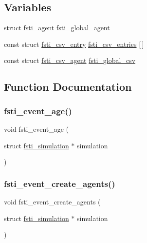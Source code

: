 \subsection*{Variables}
\begin{DoxyCompactItemize}
\item 
struct \mbox{\hyperlink{structfsti__agent}{fsti\+\_\+agent}} \mbox{\hyperlink{fsti-events_8c_a0c5214ba8681a0691658466b19dde4d5}{fsti\+\_\+global\+\_\+agent}}
\item 
const struct \mbox{\hyperlink{structfsti__csv__entry}{fsti\+\_\+csv\+\_\+entry}} \mbox{\hyperlink{fsti-events_8c_a7101c8980d633b64a8060f6f91c48dcd}{fsti\+\_\+csv\+\_\+entries}} \mbox{[}$\,$\mbox{]}
\item 
const struct \mbox{\hyperlink{structfsti__csv__agent}{fsti\+\_\+csv\+\_\+agent}} \mbox{\hyperlink{fsti-events_8c_a7f2bcfae00114763a58e88a609eacf3e}{fsti\+\_\+global\+\_\+csv}}
\end{DoxyCompactItemize}


\subsection{Function Documentation}
\mbox{\label{fsti-events_8c_a37075282270dcb4f507a3cf7a302dc21}} 
\subsubsection{\texorpdfstring{fsti\+\_\+event\+\_\+age()}{fsti\_event\_age()}}
{\footnotesize\ttfamily void fsti\+\_\+event\+\_\+age (\begin{DoxyParamCaption}\item[{struct \mbox{\hyperlink{structfsti__simulation}{fsti\+\_\+simulation}} $\ast$}]{simulation }\end{DoxyParamCaption})}

\mbox{\label{fsti-events_8c_a030bb87f8eda0fe6b1ef2ed7be908e60}} 
\subsubsection{\texorpdfstring{fsti\+\_\+event\+\_\+create\+\_\+agents()}{fsti\_event\_create\_agents()}}
{\footnotesize\ttfamily void fsti\+\_\+event\+\_\+create\+\_\+agents (\begin{DoxyParamCaption}\item[{struct \mbox{\hyperlink{structfsti__simulation}{fsti\+\_\+simulation}} $\ast$}]{simulation }\end{DoxyParamCaption})}

